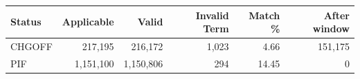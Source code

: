 \begingroup\small\setlength{\tabcolsep}{3pt}
\begin{tabularx}{\linewidth}{Xrrrrr}\toprule
Status & Applicable & Valid & Invalid Term & Match \% & After window \\ \midrule
CHGOFF & 217,195 & 216,172 & 1,023 & 4.66 & 151,175 \\
PIF & 1,151,100 & 1,150,806 & 294 & 14.45 & 0 \\
\bottomrule\end{tabularx}\endgroup
